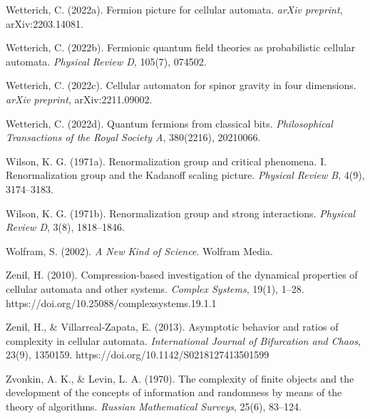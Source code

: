 \documentclass[
]{article}
\begin{document}
Wetterich, C. (2022a). Fermion picture for cellular automata.
\emph{arXiv preprint}, arXiv:2203.14081.

Wetterich, C. (2022b). Fermionic quantum field theories as probabilistic
cellular automata. \emph{Physical Review D}, 105(7), 074502.

Wetterich, C. (2022c). Cellular automaton for spinor gravity in four
dimensions. \emph{arXiv preprint}, arXiv:2211.09002.

Wetterich, C. (2022d). Quantum fermions from classical bits.
\emph{Philosophical Transactions of the Royal Society A}, 380(2216),
20210066.

Wilson, K. G. (1971a). Renormalization group and critical phenomena. I.
Renormalization group and the Kadanoff scaling picture. \emph{Physical
Review B}, 4(9), 3174--3183.

Wilson, K. G. (1971b). Renormalization group and strong interactions.
\emph{Physical Review D}, 3(8), 1818--1846.

Wolfram, S. (2002). \emph{A New Kind of Science}. Wolfram Media.

Zenil, H. (2010). Compression-based investigation of the dynamical
properties of cellular automata and other systems. \emph{Complex
Systems}, 19(1), 1--28. https://doi.org/10.25088/complexsystems.19.1.1

Zenil, H., \& Villarreal-Zapata, E. (2013). Asymptotic behavior and
ratios of complexity in cellular automata. \emph{International Journal
of Bifurcation and Chaos}, 23(9), 1350159.
https://doi.org/10.1142/S0218127413501599

Zvonkin, A. K., \& Levin, L. A. (1970). The complexity of finite objects
and the development of the concepts of information and randomness by
means of the theory of algorithms. \emph{Russian Mathematical Surveys},
25(6), 83--124.
\end{document}
